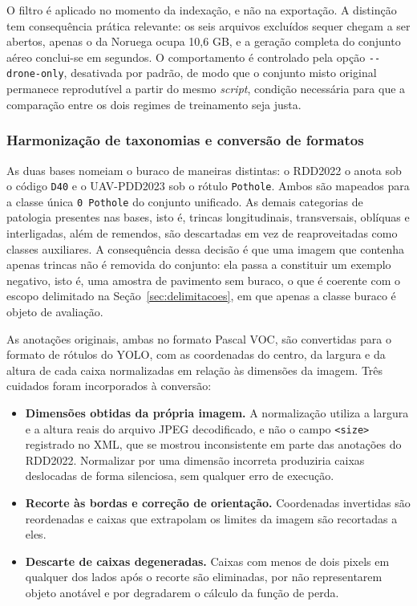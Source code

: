\documentclass[12pt]{article}
\begin{document}
O filtro é aplicado no momento da indexação, e não na exportação. A
distinção tem consequência prática relevante: os seis arquivos excluídos
sequer chegam a ser abertos, apenas o da Noruega ocupa 10,6 GB, e a
geração completa do conjunto aéreo conclui-se em segundos. O
comportamento é controlado pela opção \texttt{-{}-drone-only},
desativada por padrão, de modo que o conjunto misto original permanece
reprodutível a partir do mesmo \emph{script}, condição necessária para
que a comparação entre os dois regimes de treinamento seja justa.

\subsubsection{Harmonização de taxonomias e conversão de formatos}
\label{sec:harmonizacao}

As duas bases nomeiam o buraco de maneiras distintas: o RDD2022 o anota
sob o código \texttt{D40} e o UAV-PDD2023 sob o rótulo
\texttt{Pothole}. Ambos são mapeados para a classe única
\texttt{0 Pothole} do conjunto unificado. As demais categorias de
patologia presentes nas bases, isto é, trincas longitudinais,
transversais, oblíquas e interligadas, além de remendos, são descartadas
em vez de reaproveitadas como classes auxiliares. A consequência dessa
decisão é que uma imagem que contenha apenas trincas não é removida do
conjunto: ela passa a constituir um exemplo negativo, isto é, uma amostra
de pavimento sem buraco, o que é coerente com o escopo delimitado na
Seção~\ref{sec:delimitacoes}, em que apenas a classe buraco é objeto de
avaliação.

As anotações originais, ambas no formato Pascal VOC, são convertidas para
o formato de rótulos do YOLO, com as coordenadas do centro, da largura e
da altura de cada caixa normalizadas em relação às dimensões da imagem.
Três cuidados foram incorporados à conversão:

\begin{itemize}
  \item \textbf{Dimensões obtidas da própria imagem.} A normalização
    utiliza a largura e a altura reais do arquivo JPEG decodificado, e
    não o campo \texttt{<size>} registrado no XML, que se mostrou
    inconsistente em parte das anotações do RDD2022. Normalizar por uma
    dimensão incorreta produziria caixas deslocadas de forma silenciosa,
    sem qualquer erro de execução.
  \item \textbf{Recorte às bordas e correção de orientação.} Coordenadas
    invertidas são reordenadas e caixas que extrapolam os limites da
    imagem são recortadas a eles.
  \item \textbf{Descarte de caixas degeneradas.} Caixas com menos de dois
    pixels em qualquer dos lados após o recorte são eliminadas, por não
    representarem objeto anotável e por degradarem o cálculo da função de
    perda.
\end{itemize}
\end{document}
